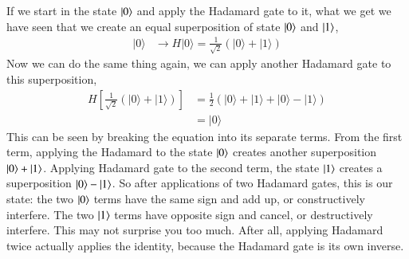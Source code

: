 If we start in the state $\left| 0 \right\rangle$ and apply the Hadamard gate to it, what we get we have seen that we create an equal superposition of state $\left| 0 \right\rangle$ and $\left| 1 \right\rangle$,
\begin{equation}
\begin{aligned}
|0\rangle & \longrightarrow H|0\rangle=\frac{1}{\sqrt{2}}(|0\rangle+|1\rangle)
\end{aligned}
\end{equation}
Now we can do the same thing again, we can apply another Hadamard gate to this superposition,
\begin{equation}
\begin{aligned}
H\left[\frac{1}{\sqrt{2}}(|0\rangle+|1\rangle)\right] &=\frac{1}{2}(|0\rangle+|1\rangle+|0\rangle-|1\rangle) \\
&=|0\rangle
\end{aligned}
\end{equation}
This can be seen by breaking the equation into its separate terms. From the first term, applying the Hadamard to the state $\left| 0 \right\rangle$ creates another superposition $\left| 0 \right\rangle+\left| 1 \right\rangle$. Applying Hadamard gate to the second term, the state $\left| 1 \right\rangle$ creates a superposition $\left| 0 \right\rangle-\left| 1 \right\rangle$. So after applications of two Hadamard gates, this is our state: the two $\left| 0 \right\rangle$ terms have the same sign and add up, or constructively interfere. The two $\left| 1 \right\rangle$ terms have opposite sign and cancel, or destructively interfere.
This may not surprise you too much. After all, applying Hadamard twice actually applies the identity, because the Hadamard gate is its own inverse.


